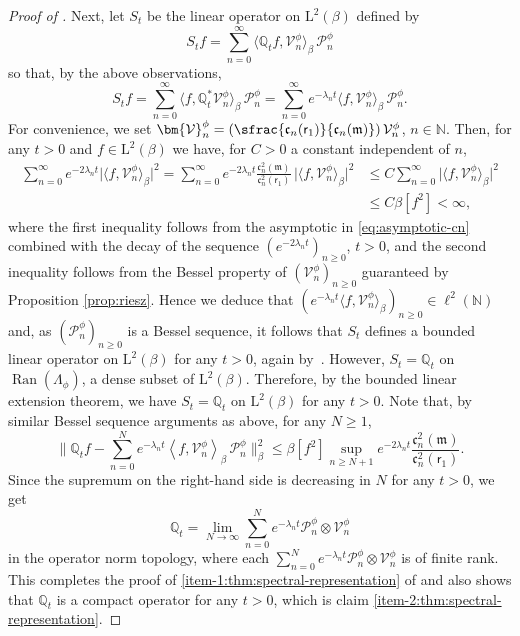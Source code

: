 \documentclass[JEP,XML,SOM,Unicode]{cedram}
\newcommand{\Psfrac}[2]{(\sfrac{#1}{#2})}
\theoremstyle{plain}
\theoremstyle{definition}
\newcommand{\bbnorm}[1]{\biggl\lVert#1\biggr\rVert}
\DeclareMathOperator{\Ran}{Ran}
\newcommand{\N}{\mathbb{N}}
\renewcommand{\P}{\mathcal{P}}
\newcommand{\V}{\mathcal{V}}
\newcommand{\J}{\mathds{Q}}
\newcommand{\Leb}{\mathrm{L}}
\newcommand{\m}{\mathfrak{m}}
\newcommand{\vat}{{\mathsf{r}_1}}
\let\bpsi\beta
\begin{document}
\begin{proof}[Proof of ]
Next, let $S_t$ be the linear operator on $\Leb^2(\bpsi)$ defined by
\begin{equation*}
S_t f = \sum_{n=0}^\infty \langle \J_t f, \V_n^\phi \rangle_{\bpsi}\, \P_n^\phi
\end{equation*}
so that, by the above observations,
\begin{equation*}
S_t f = \sum_{n=0}^\infty \langle f, \J_t^* \V_n^\phi \rangle_{\bpsi}\, \P_n^\phi = \sum_{n=0}^\infty e^{-\lambda_n t} \langle f, \V_n^\phi \rangle_{\bpsi}\, \P_n^\phi.
\end{equation*}
For convenience, we set ${\bm{\V}}_n^\phi = \Psfrac{\mathfrak{c}_n(\vat)}{\mathfrak{c}_n(\m)}\, \V_n^\phi$, $n \in \N$. Then, for any $t > 0$ and $f \in \Leb^2(\bpsi)$ we have, for $C >0$ a constant independent of $n$,
\begin{align*}
\sum_{n=0}^\infty e^{-2\lambda_n t} \bigl|\bigl\langle f, \V_n^\phi \bigr\rangle_{\bpsi}\bigr|^2 = \sum_{n=0}^\infty e^{-2 \lambda_n t} \frac{\mathfrak{c}_n^2(\m)}{\mathfrak{c}_n^2(\vat)}\, \bigl|\bigl\langle f, {\bm{\V}}_n^\phi\bigr\rangle_{\bpsi}\bigr|^2 &\leq C \sum_{n=0}^\infty \bigl|\bigl\langle f, {\bm{\V}}_n^\phi \bigr\rangle_{\bpsi}\bigr|^2\\
&\leq C \bpsi [f^2] < \infty,
\end{align*}
where the first inequality follows from the asymptotic in \eqref{eq:asymptotic-cn} combined with the decay of the sequence $(e^{-2\lambda_n t})_{n \geq 0}$, $t > 0$, and the second inequality follows from the Bessel property of $({\bm{\V}}_n^\phi )_{n \geq 0}$ guaranteed by Proposition \ref{prop:riesz}. Hence we deduce that $\left(e^{-\lambda_n t} \langle f, \V_n^\phi \rangle_{\bpsi}\right)_{n \geq 0} \in \ell^2(\N)$ and, as $(\P_n^\phi)_{n \geq 0}$ is a Bessel sequence, it follows that $S_t$ defines a bounded linear operator on $\Leb^2(\bpsi)$ for any $t > 0$, again by~\cite[Th.\,3.1.3]{Christensen2003a}. However, $S_t = \J_t$ on $\Ran(\Lambda_\phi)$, a dense subset of $\Leb^2(\bpsi)$. Therefore, by the bounded linear extension theorem, we have $S_t = \J_t$ on $\Leb^2(\bpsi)$ for any $t > 0$. Note that, by similar Bessel sequence arguments as above, for any $N \geq 1$,
\begin{equation*}
\bbnorm{\J_tf -\sum_{n=0}^N e^{-\lambda_n t} \left\langle f, \V_n^\phi \right\rangle_{\bpsi}\, \P_n^\phi}_\bpsi^2 \leq \bpsi [f^2] \sup_{n \geq N+1} e^{-2 \lambda_n t} \frac{\mathfrak{c}_n^2(\m)}{\mathfrak{c}_n^2(\vat)}.
\end{equation*}
Since the supremum on the right-hand side is decreasing in $N$ for any $t > 0$, we get
\begin{equation*}
\J_t = \lim_{N \to \infty} \sum_{n=0}^N e^{-\lambda_n t} \P_n^\phi \otimes \V_n^\phi
\end{equation*}
in the operator norm topology, where each $\sum_{n=0}^N e^{-\lambda_n t} \P_n^\phi \otimes \V_n^\phi$ is of finite rank. This completes the proof of \eqref{item-1:thm:spectral-representation} of  and also shows that $\J_t$ is a compact operator for any $t > 0$, which is claim \eqref{item-2:thm:spectral-representation}.


\end{proof}
\end{document}
